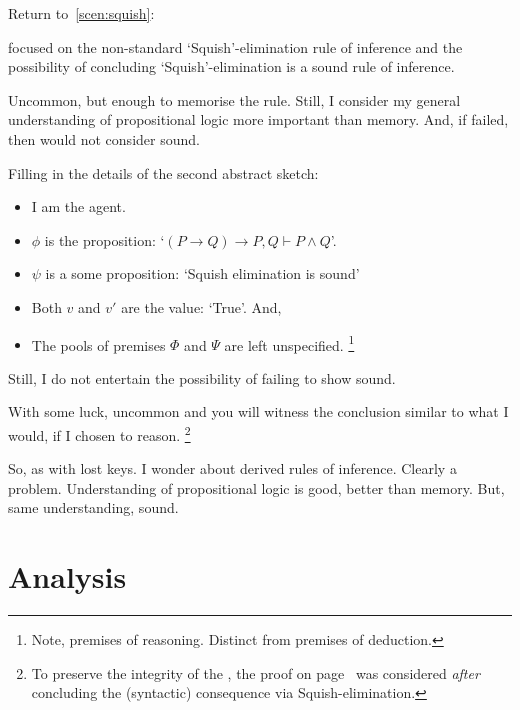 \begin{note}
  Return to~\autoref{scen:squish}:

  \scenarioPLSquish*

   focused on the non-standard `Squish'-elimination rule of inference and the possibility of concluding `Squish'-elimination is a sound rule of inference.

  Uncommon, but enough to memorise the rule.
  Still, I consider my general understanding of propositional logic more important than memory.
  And, if failed, then would not consider sound.

  Filling in the details of the second abstract sketch:
  \begin{itemize}[noitemsep]
  \item
    I am the agent.
  \item
    \(\phi\) is the proposition: `\((P \rightarrow Q) \rightarrow P, Q \vdash P \land Q\)'.
  \item
    \(\psi\) is a some proposition: `Squish elimination is sound'
  \item
    Both \(v\) and \(v'\) are the value: `True'.
    And,
  \item
    The pools of premises \(\Phi\) and \(\Psi\) are left unspecified.%
    \footnote{
      Note, premises of reasoning.
      Distinct from premises of deduction.
    }
  \end{itemize}

  Still, I do not entertain the possibility of failing to show sound.

  With some luck, uncommon and you will witness the conclusion similar to what I would, if I chosen to reason.%
  \footnote{
    To preserve the integrity of the , the proof on page~\pageref{squish-elimination-proof} was considered \emph{after} concluding the (syntactic) consequence via Squish-elimination.
  }
\end{note}

\begin{note}
  So, as with lost keys.
  I wonder about derived rules of inference.
  Clearly a problem.
  Understanding of propositional logic is good, better than memory.
  But, same understanding, sound.
\end{note}

\section{Analysis}
\label{cha:zS:sec:lost-keys:analysis}

